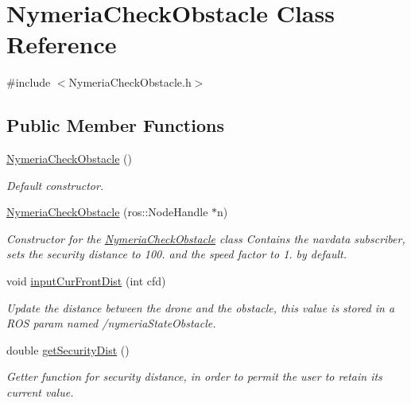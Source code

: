 \hypertarget{class_nymeria_check_obstacle}{}\section{Nymeria\+Check\+Obstacle Class Reference}
\label{class_nymeria_check_obstacle}


{\ttfamily \#include $<$Nymeria\+Check\+Obstacle.\+h$>$}

\subsection*{Public Member Functions}
\begin{DoxyCompactItemize}
\item 
\hyperlink{class_nymeria_check_obstacle_a1f04bd678ea83029bcf54c3100f7c3c8}{Nymeria\+Check\+Obstacle} ()
\begin{DoxyCompactList}\small\item\em Default constructor. \end{DoxyCompactList}\item 
\hyperlink{class_nymeria_check_obstacle_a6e99c59339b970f92602628dcaf982fb}{Nymeria\+Check\+Obstacle} (ros\+::\+Node\+Handle $\ast$n)
\begin{DoxyCompactList}\small\item\em Constructor for the \hyperlink{class_nymeria_check_obstacle}{Nymeria\+Check\+Obstacle} class Contains the navdata subscriber, sets the security distance to 100. and the speed factor to 1. by default. \end{DoxyCompactList}\item 
void \hyperlink{class_nymeria_check_obstacle_a4232159e2b12378f489291374a325510}{input\+Cur\+Front\+Dist} (int cfd)
\begin{DoxyCompactList}\small\item\em Update the distance between the drone and the obstacle, this value is stored in a R\+O\+S param named /nymeria\+State\+Obstacle. \end{DoxyCompactList}\item 
double \hyperlink{class_nymeria_check_obstacle_ace7bb41e1f1b18b170c528825531d75d}{get\+Security\+Dist} ()
\begin{DoxyCompactList}\small\item\em Getter function for security distance, in order to permit the user to retain its current value. \end{DoxyCompactList}\item 

\end{DoxyCompactItemize}
